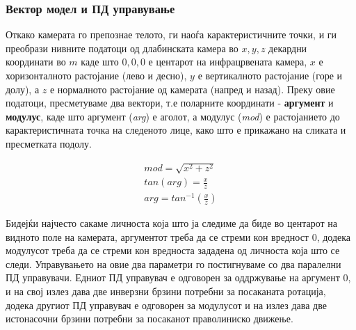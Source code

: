 \documentclass[12pt]{article}
\begin{document}
    \subsubsection{Вектор модел и ПД управување}

      Откако камерата го препознае телото, ги наоѓа карактеристичните точки, и ги преобрази нивните податоци од длабинската камера во $ x,y,z $ декардни координати во $ m $ каде што $ 0,0,0 $ е центарот на инфрацрвената камера, $x$ е хоризонталното растојание (лево и десно), $y$ е вертикалното растојание (горе и долу), а $z$ е нормалното растојание од камерата (напред и назад). Преку овие податоци, пресметуваме два вектори, т.е поларните координати - \textbf{аргумент} и \textbf{модулус}, каде што аргумент (\textit{arg}) е аголот, а модулус (\textit{mod}) е растојанието до карактеристичната точка на следеното лице, како што е прикажано на сликата и пресметката подолу.


      \begin{equation} \label{eq:cart2pol}
        \begin{aligned}
    	  mod = \sqrt{x^{2} + z^{2}} \\
        tan(arg) = \frac{x}{z} \\
        arg = tan^{-1}(\frac{x}{z})
        \end{aligned}
        \end{equation}

      Бидејќи најчесто сакаме личноста која што ја следиме да биде во центарот на видното поле на камерата, аргументот треба да се стреми кон вредност 0, додека модулусот треба да се стреми кон вредноста зададена од личноста која што се следи. Управувањето на овие два параметри го постигнуваме со два паралелни ПД управувачи. Едниот ПД управувач е одговорен за оддржување на аргумент 0, и на свој излез дава две инверзни брзини потребни за посаканата ротација, додека другиот ПД управувач е одговорен за модулусот и на излез дава две истонасочни брзини потребни за посаканот праволиниско движење.
\end{document}
